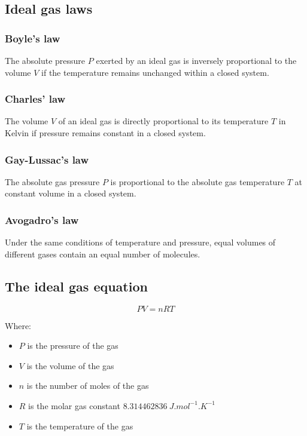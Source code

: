 \documentclass[11pt]{article}
\begin{document}
\subsection{Ideal gas laws}
\label{sec:org5812a64}

\subsubsection{Boyle's law}
\label{sec:org8027fe7}
The absolute pressure \(P\) exerted by an ideal gas is inversely proportional to the volume \(V\) if the temperature remains unchanged within a closed system.

\subsubsection{Charles' law}
\label{sec:org341bdc1}
The volume \(V\) of an ideal gas is directly proportional to its temperature \(T\) in Kelvin if pressure remains constant in a closed system.

\subsubsection{Gay-Lussac's law}
\label{sec:org912f34d}
The absolute gas pressure \(P\) is proportional to the absolute gas temperature \(T\) at constant volume in a closed system.

\subsubsection{Avogadro's law}
\label{sec:org51424cc}
Under the same conditions of temperature and pressure, equal volumes of different gases contain an equal number of molecules.

\subsection{The ideal gas equation}
\label{sec:org88ae5dd}
\[PV = nRT\]

Where:
\begin{itemize}
\item \(P\) is the pressure of the gas
\item \(V\) is the volume of the gas
\item \(n\) is the number of moles of the gas
\item \(R\) is the molar gas constant \(\qty{8.314462836}{J.mol^{-1}.K^{-1}}\)
\item \(T\) is the temperature of the gas
\end{itemize}
\end{document}
